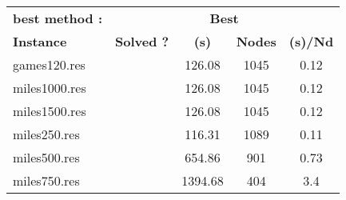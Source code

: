 \documentclass[main.tex]{subfiles}
\begin{document}
\thispagestyle{empty}

\begin{landscape}
\begin{center}
\begin{table}[h]
\centering
\caption{}
\label{}
\renewcommand{\arraystretch}{1.4} 
\begin{tabular}{|l|cccc|}
	\hline
\textbf{best method :} & \multicolumn{4}{c}{\textbf{Best}}\\
\textbf{Instance}  & \textbf{Solved ?} & \textbf{(s)} & \textbf{Nodes} & \textbf{(s)/Nd}\\\hline

games120.res &  & 126.08 & 1045 & 0.12
\\
miles1000.res &  & 126.08 & 1045 & 0.12
\\
miles1500.res &  & 126.08 & 1045 & 0.12
\\
miles250.res &  & 116.31 & 1089 & 0.11
\\
miles500.res &  & 654.86 & 901 & 0.73
\\
miles750.res &  & 1394.68 & 404 & 3.4
\\
\hline\end{tabular}
\end{table}
\end{center}
\end{landscape}
\end{document}
